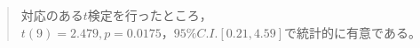 \begin{quote}
   対応のある$t$検定を行ったところ，$t(9)=2.479,p=0.0175，95\%C.I.[0.21,4.59]$で統計的に有意である。
\end{quote}
